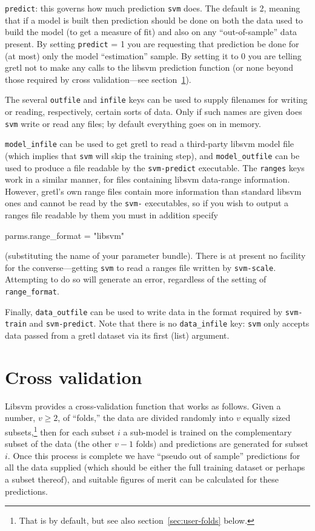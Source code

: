 \documentclass{article}
\begin{document}
\texttt{predict}: this governs how much prediction \texttt{svm} does.
The default is 2, meaning that if a model is built then prediction
should be done on both the data used to build the model (to get a
measure of fit) and also on any ``out-of-sample'' data present. By
setting \texttt{predict} = 1 you are requesting that prediction be
done for (at most) only the model ``estimation'' sample. By setting it
to 0 you are telling gretl not to make any calls to the
\textsf{libsvm} prediction function (or none beyond those required
by cross validation---see section~\ref{sec:xvalid}).

The several \texttt{outfile} and \texttt{infile} keys can be used to
supply filenames for writing or reading, respectively, certain sorts
of data. Only if such names are given does \texttt{svm} write or read
any files; by default everything goes on in memory.

\texttt{model\_infile} can be used to get gretl to read a third-party
\textsf{libsvm} model file (which implies that \texttt{svm} will skip
the training step), and \texttt{model\_outfile} can be used to produce
a file readable by the \texttt{svm-predict} executable.  The
\texttt{ranges} keys work in a similar manner, for files containing
\textsf{libsvm} data-range information. However, gretl's own range
files contain more information than standard \textsf{libsvm} ones and
cannot be read by the \texttt{svm-} executables, so if you wish to
output a ranges file readable by them you must in addition specify
\begin{code}
parms.range_format = "libsvm"
\end{code}
(substituting the name of your parameter bundle). There is at present
no facility for the converse---getting \texttt{svm} to read a ranges
file written by \texttt{svm-scale}. Attempting to do so will generate
an error, regardless of the setting of \texttt{range\_format}.

Finally, \texttt{data\_outfile} can be used to write data in the
format required by \texttt{svm-train} and \texttt{svm-predict}. Note
that there is no \texttt{data\_infile} key: \texttt{svm} only accepts
data passed from a gretl dataset via its first (list) argument.

\section{Cross validation}
\label{sec:xvalid}

\textsf{Libsvm} provides a cross-validation function that works as
follows. Given a number, $v \geq 2$, of ``folds,'' the data are
divided randomly into $v$ equally sized subsets,\footnote{That is by
  default, but see also section~\ref{sec:user-folds} below.} then
for each subset $i$ a sub-model is trained on the complementary subset
of the data (the other $v-1$ folds) and predictions are generated for
subset $i$. Once this process is complete we have ``pseudo out of
sample'' predictions for all the data supplied (which should be either
the full training dataset or perhaps a subset thereof), and suitable
figures of merit can be calculated for these predictions.
\end{document}
